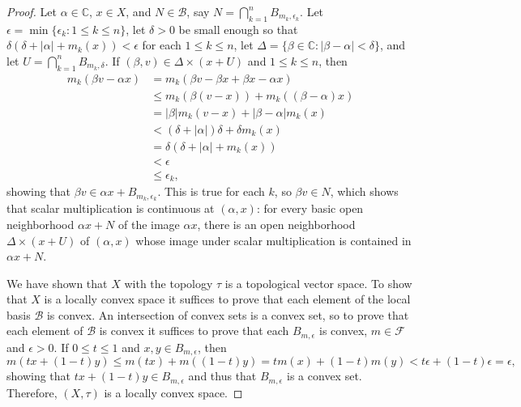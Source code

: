 \documentclass{article}
\begin{document}
\begin{proof}
Let $\alpha \in \mathbb{C}$, $x \in X$, and $N \in \mathscr{B}$, say $N = \bigcap_{k=1}^n B_{m_k,\epsilon_k}$. Let
$\epsilon=\min \{\epsilon_k: 1 \leq k \leq n\}$, 
let $\delta>0$ be small enough so that $\delta(\delta+|\alpha|+m_k(x))<\epsilon$ for each $1 \leq k \leq n$,
let $\Delta=\{\beta \in \mathbb{C}: |\beta-\alpha|<\delta\}$, and
let $U=\bigcap_{k=1}^n B_{m_k,\delta}$.
If $(\beta,v) \in \Delta \times (x+U)$ and $1 \leq k \leq n$, then
\begin{align*}
m_k(\beta v - \alpha x)&=m_k(\beta v - \beta x + \beta x - \alpha x)\\
&\leq m_k(\beta (v-x)) +m_k((\beta-\alpha) x)\\
&=|\beta| m_k(v-x) + |\beta-\alpha| m_k(x)\\
&< (\delta+|\alpha|) \delta+\delta m_k(x)\\
&=\delta(\delta+|\alpha|+m_k(x))\\
&<\epsilon\\
&\leq \epsilon_k,
\end{align*}
showing that $\beta v \in \alpha x + B_{m_k,\epsilon_k}$. This is true for each $k$, so $\beta v \in N$, which shows
that scalar multiplication is continuous at $(\alpha,x)$: for every basic open neighborhood $\alpha x +N$ of the image $\alpha x$,
there is an open neighborhood $\Delta \times (x+U)$ of $(\alpha,x)$ whose image under scalar multiplication
is contained in $\alpha x+N$.


We have shown that $X$ with the topology $\tau$ is a topological vector space. To show that $X$ is a locally convex space it
suffices to prove that each element of the local basis $\mathscr{B}$ is convex. An intersection of convex sets is a convex set,
so to prove that each element of $\mathscr{B}$ is convex it suffices to prove that each $B_{m,\epsilon}$ is convex, 
$m \in \mathscr{F}$ and $\epsilon>0$. If $0 \leq t \leq 1$ and $x,y \in B_{m,\epsilon}$, then
\[
m(tx+(1-t)y) \leq m(tx)+m((1-t)y) = tm(x)+(1-t)m(y)<t\epsilon+(1-t)\epsilon=\epsilon,
\]
showing that $tx+(1-t)y \in B_{m,\epsilon}$ and thus that $B_{m,\epsilon}$ is a convex set. Therefore, $(X,\tau)$ is a locally
convex space. 
\end{proof}
\end{document}
